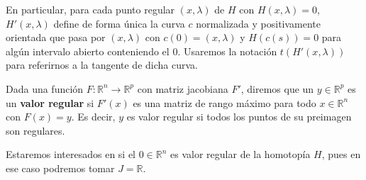 En particular, para cada punto regular $(x,\lambda)$ de $H$ con $H(x,\lambda)=0$, $H'(x,\lambda)$ define de forma única la curva $c$ normalizada y positivamente orientada que pasa por $(x,\lambda)$ con $c(0)=(x,\lambda)$ y $H(c(s))=0$ para algún intervalo abierto conteniendo el $0$. Usaremos la notación $t(H'(x,\lambda))$ para referirnos a la tangente de dicha curva. 

\begin{definition}
	Dada una función $F : \mathbb{R}^n \to \mathbb{R}^p$ con matriz jacobiana $F'$, diremos que un $y\in \mathbb{R}^p$ es un \textbf{valor regular} si $F'(x)$ es una matriz de rango máximo para todo $x \in \mathbb{R}^n$ con $F(x)=y$.
	Es decir, $y$ es valor regular si todos los puntos de su preimagen son regulares.
\end{definition}

Estaremos interesados en si el $0 \in \mathbb{R}^n$ es valor regular de la homotopía $H$, pues en ese caso podremos tomar $J=\mathbb{R}$.

